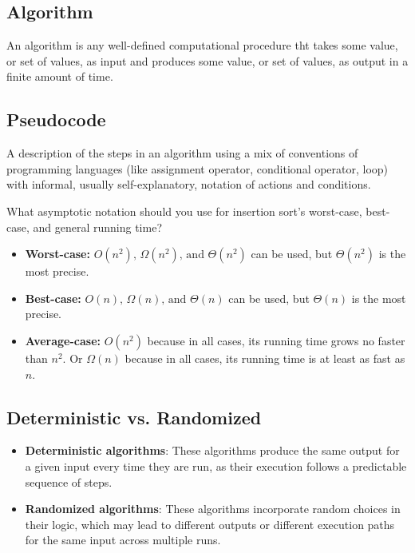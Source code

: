 \subsection{Algorithm}
\begin{definition}
    An algorithm is any well-defined computational procedure tht takes some value, or set of values, as input and produces some value, or set of values, as output in a finite amount of time. 
\end{definition}

\subsection{Pseudocode}
\begin{definition}
    A description of the steps in an algorithm using a mix of conventions of programming languages (like assignment operator, conditional operator, loop) with informal, usually self-explanatory, notation of actions and conditions.
\end{definition}

\begin{example}
    What asymptotic notation should you use for insertion sort's worst-case, best-case, and general running time? 
    \vspace{1em}

    \begin{itemize}
        \item \textbf{Worst-case:} $O(n^2)\text{, } \Omega(n^2)\text{, and } \Theta(n^2)$ can be used, but $\Theta(n^2)$ is the most precise. 
        \item \textbf{Best-case:} $O(n)\text{, } \Omega(n)\text{, and } \Theta(n)$ can be used, but $\Theta(n)$ is the most precise. 
        \item \textbf{Average-case:} $O(n^2)$ because in all cases, its running time grows no faster than $n^2$. Or $\Omega(n)$ because in all cases, its running time is at least as fast as $n$.
    \end{itemize}
\end{example}

\subsection{Deterministic vs. Randomized}
\begin{definition}
    \begin{itemize}
        \item \textbf{Deterministic algorithms}: These algorithms produce the same output for a given input every time they are run, as their execution follows a predictable sequence of steps.
        \item \textbf{Randomized algorithms}: These algorithms incorporate random choices in their logic, which may lead to different outputs or different execution paths for the same input across multiple runs.
    \end{itemize}
\end{definition}

